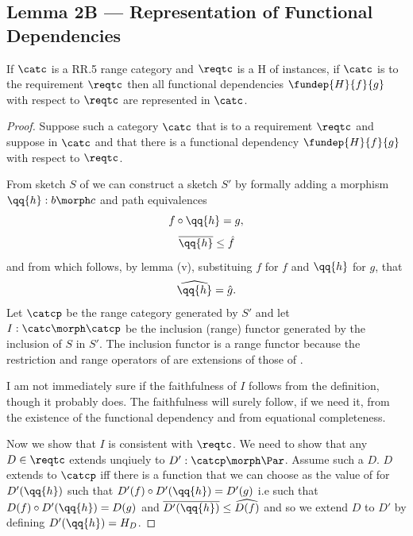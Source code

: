 
\subsection{Lemma 2B --- Representation of Functional Dependencies}

\begin{lemma}
If $\catc$ is a RR.5 range category and $\reqtc$ is a H of instances, if $\catc$ is 
 to the requirement $\reqtc$ then
all functional dependencies $\fundep{H}{f}{g}$  with respect to $\reqtc$ are represented in $\catc$.
\end{lemma}
\begin{proof}

Suppose such a category  $\catc$  that  is 
 to a requirement $\reqtc$ and suppose
\fgsourcediag
in $\catc$ 
and that there is a functional dependency $\fundep{H}{f}{g}$ with respect to $\reqtc$.

From sketch $S$ of \catcw we can construct a sketch $S'$ by formally 
adding a morphism $\qq{h}: b \morph c$
and path equivalences 
\begin{equation}
\label{hquote}
f \circ \qq{h} = g,
\end{equation} 
\begin{equation}
\label{hquotebar}
\overline{\qq{h}}\leq\hat{f}
\end{equation} 
and 
from which follows, by lemma  (v), 
substituing
$f$ for $f$
and
$\qq{h}$ for $g$, that
\begin{equation}
\label{hquotehat}
\widehat{\qq{h}}=\hat{g}. 
\end{equation} 
Let $\catcp$ be the range category generated by $S'$ and
let $I: \catc\morph \catcp$ be the inclusion (range) functor 
generated by the inclusion of $S$ in $S'$. 
The inclusion functor is a range functor because the restriction and range operators of \catcpw are extensions of those
of \catc.

\begin{aside}
I am not immediately sure if the faithfulness of $I$ 
follows from the definition, though it probably does. The faithfulness will surely follow, if we need it, from the existence of the functional dependency and from equational completeness.
\end{aside}

Now we show that $I$ is consistent with $\reqtc$. 
We need to show that any $D \in \reqtc$
extends unqiuely to $D' :\catcp \morph \Par$. Assume such a $D$. 
$D$  extends to $\catcp$ iff there is a  function that we can choose as the value of  for $D'(\qq{h})$  such that $D'(f) \circ D'(\qq{h}) = D'(g)$ i.e such that
$D(f) \circ D'(\qq{h}) = D(g)$ and $\overline{D'(\qq{h})}\leq \widehat{D(f)}$
and so we  extend $D$ to $D'$ 
 by defining $D'(\qq{h})=H_D$. 


\end{proof}

